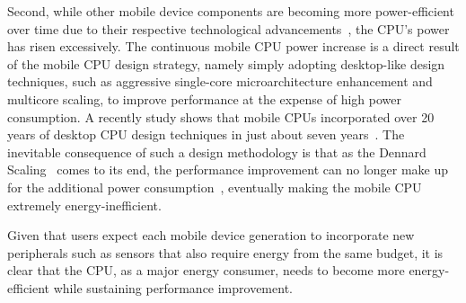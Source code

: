 Second, while other mobile device components are becoming more power-efficient over time due to their respective technological advancements~\cite{chen2013energy}, the CPU's power has risen excessively. The continuous mobile CPU power increase is a direct result of the mobile CPU design strategy, namely simply adopting desktop-like design techniques, such as aggressive single-core microarchitecture enhancement and multicore scaling, to improve performance at the expense of high power consumption. A recently study shows that mobile CPUs incorporated over 20 years of desktop CPU design techniques in just about seven years~\cite{mobilecpu}. The inevitable consequence of such a design methodology is that as the Dennard Scaling~\cite{dennard} comes to its end, the performance improvement can no longer make up for the additional power consumption~\cite{mobilecpu}, eventually making the mobile CPU extremely energy-inefficient.

Given that users expect each mobile device generation to incorporate new peripherals such as sensors that also require energy from the same budget, it is clear that the CPU, as a major energy consumer, needs to become more energy-efficient while sustaining performance improvement.














